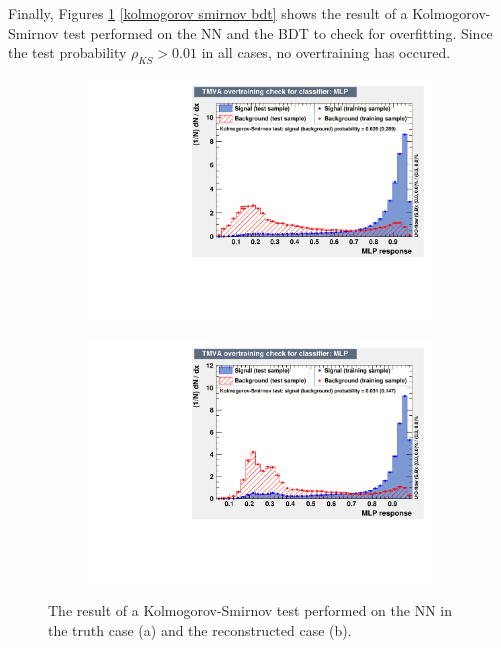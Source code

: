 \documentclass[10pt,a4paper]{book}
\begin{document}
Finally, Figures \ref{kolmogorov smirnov mlp} \ref{kolmogorov smirnov bdt} shows the result of a Kolmogorov-Smirnov test \cite{10.2307/2280095} performed on the NN and the BDT to check for overfitting. Since the test probability $\rho_{KS} > 0.01$ in all cases, no overtraining has occured. 

\begin{figure}[h]
\begin{subfigure}{1.0\textwidth}
\centering
\includegraphics[scale=0.7]{ch4_images/MLP_overtraining_truth.pdf}
\caption{}
\end{subfigure}
\begin{subfigure}{1.0\textwidth}
\centering
\includegraphics[scale=0.7]{ch4_images/MLP_overtraining_reco.pdf}
\caption{}
\end{subfigure}
\caption{The result of a Kolmogorov-Smirnov test performed on the NN in the truth case (a) and the reconstructed case (b).}
\label{kolmogorov smirnov mlp}
\end{figure} 
\end{document}
